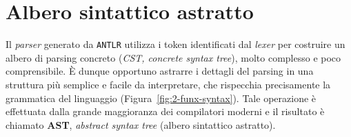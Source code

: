 \section{Albero sintattico astratto}
\label{sec:5-4-abstract-syntax-tree}

Il \textit{parser} generato da \texttt{ANTLR} utilizza i token identificati dal \textit{lexer} per costruire
un albero di parsing concreto (\textit{CST, concrete syntax tree}), molto complesso e poco comprensibile.
È dunque opportuno astrarre i dettagli del parsing in una struttura più semplice e facile da interpretare,
che rispecchia precisamente la grammatica del linguaggio (Figura~\ref{fig:2-funx-syntax}).
Tale operazione è effettuata dalla grande maggioranza dei compilatori moderni e il risultato è chiamato
\textbf{AST}, \textit{abstract syntax tree} (albero sintattico astratto).



\newpage


